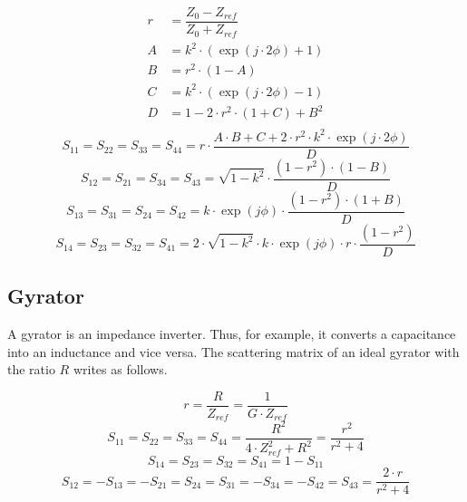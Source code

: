 \begin{align}
r &= \dfrac{Z_0-Z_{ref}}{Z_0+Z_{ref}} \\
A &= k^2 \cdot \left( \exp\left(j\cdot 2\phi\right)+1 \right) \\
B &= r^2 \cdot \left(1-A\right) \\
C &= k^2 \cdot \left( \exp\left(j\cdot 2\phi\right)-1 \right) \\
D &= 1 - 2\cdot r^2\cdot \left(1+C\right) + B^2 \\
\end{align}
\begin{equation}
S_{11} = S_{22} = S_{33} = S_{44} = r\cdot\dfrac{A\cdot B + C + 2\cdot r^2\cdot k^2\cdot\exp\left(j\cdot 2\phi\right)}{D}
\end{equation}
\begin{equation}
S_{12} = S_{21} = S_{34} = S_{43} = \sqrt{1-k^2}\cdot \dfrac{\left(1-r^2\right)\cdot \left(1-B\right)}{D}
\end{equation}
\begin{equation}
S_{13} = S_{31} = S_{24} = S_{42} = k\cdot\exp\left(j\phi\right)\cdot \dfrac{\left(1-r^2\right)\cdot \left(1+B\right)}{D}
\end{equation}
\begin{equation}
S_{14} = S_{23} = S_{32} = S_{41} = 2\cdot\sqrt{1-k^2}\cdot k\cdot\exp\left(j\phi\right)\cdot r\cdot \dfrac{\left(1-r^2\right)}{D}
\end{equation}

\subsection{Gyrator}

A gyrator is an impedance inverter.  Thus, for example, it converts a
capacitance into an inductance and vice versa.  The scattering matrix
of an ideal gyrator with the ratio $R$ writes as follows.

\begin{equation}
r = \frac{R}{Z_{ref}} = \frac{1}{G\cdot Z_{ref}}
\end{equation}
\begin{equation}
S_{11} = S_{22} = S_{33} = S_{44} = \frac{R^2}{4\cdot Z_{ref}^2 + R^2} = \frac{r^2}{r^2+4}
\end{equation}
\begin{equation}
S_{14} = S_{23} = S_{32} = S_{41} = 1-S_{11}
\end{equation}
\begin{equation}
S_{12} = -S_{13} = -S_{21} = S_{24} = S_{31} = -S_{34} = -S_{42} = S_{43} = \frac{2\cdot r}{r^2+4}
\end{equation}


